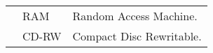 \begin{listabbv}
\setlength{\parskip}{12pt}
\setlength{\parindent}{10mm} 
\onehalfspacing
\begin{tabular}{@{}p{10mm}@{}p{2.5cm}@{}p{11.5cm}}	
    & \textsc{RAM} & Random Access Machine. \vspace*{3mm} \\   
    & \textsc{CD-RW} & Compact Disc Rewritable. \vspace*{3mm}  
\end{tabular} 
\end{listabbv}
